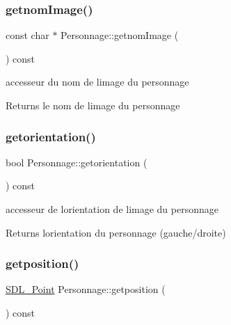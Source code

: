 \subsubsection{\texorpdfstring{getnom\+Image()}{getnomImage()}}
{\footnotesize\ttfamily const char $\ast$ Personnage\+::getnom\+Image (\begin{DoxyParamCaption}{ }\end{DoxyParamCaption}) const}



accesseur du nom de l\textquotesingle{}image du personnage 

\begin{DoxyReturn}{Returns}
le nom de l\textquotesingle{}image du personnage 
\end{DoxyReturn}
\mbox{\label{class_personnage_a5fc5f92a5361fc5b93e8e176331eab3c}} 
\subsubsection{\texorpdfstring{getorientation()}{getorientation()}}
{\footnotesize\ttfamily bool Personnage\+::getorientation (\begin{DoxyParamCaption}{ }\end{DoxyParamCaption}) const}



accesseur de l\textquotesingle{}orientation de l\textquotesingle{}image du personnage 

\begin{DoxyReturn}{Returns}
l\textquotesingle{}orientation du personnage (gauche/droite) 
\end{DoxyReturn}
\mbox{\label{class_personnage_ae3d90b3d06aad9e158dfb32a0082eb46}} 
\subsubsection{\texorpdfstring{getposition()}{getposition()}}
{\footnotesize\ttfamily \hyperlink{struct_s_d_l___point}{S\+D\+L\+\_\+\+Point} Personnage\+::getposition (\begin{DoxyParamCaption}{ }\end{DoxyParamCaption}) const}



